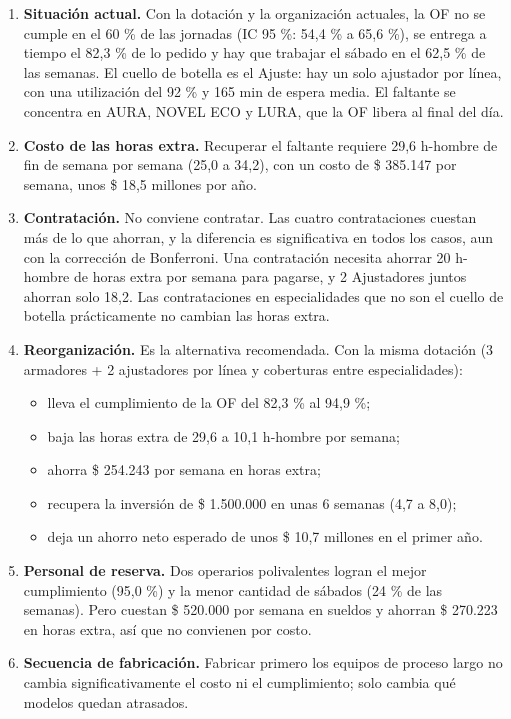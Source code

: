 \documentclass[11pt,a4paper]{article}
\begin{document}
\begin{enumerate}
\item \textbf{Situación actual.} Con la dotación y la organización actuales, la OF no se cumple en el 60 \% de las jornadas (IC 95 \%: 54,4 \% a 65,6 \%), se entrega a tiempo el 82,3 \% de lo pedido y hay que trabajar el sábado en el 62,5 \% de las semanas. El cuello de botella es el Ajuste: hay un solo ajustador por línea, con una utilización del 92 \% y 165 min de espera media. El faltante se concentra en AURA, NOVEL ECO y LURA, que la OF libera al final del día.
\item \textbf{Costo de las horas extra.} Recuperar el faltante requiere 29,6 h-hombre de fin de semana por semana (25,0 a 34,2), con un costo de \$ 385.147 por semana, unos \$ 18,5 millones por año.
\item \textbf{Contratación.} No conviene contratar. Las cuatro contrataciones cuestan más de lo que ahorran, y la diferencia es significativa en todos los casos, aun con la corrección de Bonferroni. Una contratación necesita ahorrar 20 h-hombre de horas extra por semana para pagarse, y 2 Ajustadores juntos ahorran solo 18,2. Las contrataciones en especialidades que no son el cuello de botella prácticamente no cambian las horas extra.
\item \textbf{Reorganización.} Es la alternativa recomendada. Con la misma dotación (3 armadores + 2 ajustadores por línea y coberturas entre especialidades):
\begin{itemize}
\item lleva el cumplimiento de la OF del 82,3 \% al 94,9 \%;
\item baja las horas extra de 29,6 a 10,1 h-hombre por semana;
\item ahorra \$ 254.243 por semana en horas extra;
\item recupera la inversión de \$ 1.500.000 en unas 6 semanas (4,7 a 8,0);
\item deja un ahorro neto esperado de unos \$ 10,7 millones en el primer año.
\end{itemize}
\item \textbf{Personal de reserva.} Dos operarios polivalentes logran el mejor cumplimiento (95,0 \%) y la menor cantidad de sábados (24 \% de las semanas). Pero cuestan \$ 520.000 por semana en sueldos y ahorran \$ 270.223 en horas extra, así que no convienen por costo.
\item \textbf{Secuencia de fabricación.} Fabricar primero los equipos de proceso largo no cambia significativamente el costo ni el cumplimiento; solo cambia qué modelos quedan atrasados.
\end{enumerate}
\end{document}
